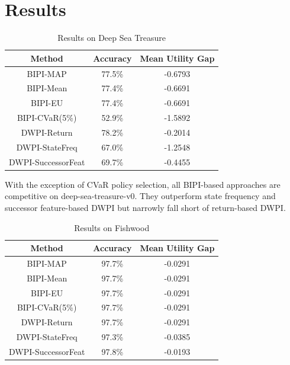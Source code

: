 \documentclass[11pt]{article}
\begin{document}
\section{Results}


\begin{table}[h!]
    \centering
    \caption{Results on Deep Sea Treasure}
    \begin{tabular}{|c|c|c|}
        \hline
        \textbf{Method} & \textbf{Accuracy} & \textbf{Mean Utility Gap} \\
        \hline
        BIPI-MAP & 77.5\% & -0.6793 \\
        \hline
        BIPI-Mean & 77.4\% & -0.6691 \\
        \hline
        BIPI-EU & 77.4\% & -0.6691 \\
        \hline
        BIPI-CVaR(5\%) & 52.9\% & -1.5892 \\
        \hline
        DWPI-Return & 78.2\% & -0.2014 \\
        \hline
        DWPI-StateFreq & 67.0\% & -1.2548 \\
        \hline
        DWPI-SuccessorFeat & 69.7\% & -0.4455 \\
        \hline
    \end{tabular}
\end{table}

With the exception of CVaR policy selection, all BIPI-based approaches are competitive on deep-sea-treasure-v0. They outperform state frequency and successor feature-based DWPI but narrowly fall short of return-based DWPI.
\newpage
\begin{table}[h!]
    \centering
    \caption{Results on Fishwood}
    \begin{tabular}{|c|c|c|}
        \hline
        \textbf{Method} & \textbf{Accuracy} & \textbf{Mean Utility Gap} \\
        \hline
        BIPI-MAP & 97.7\% & -0.0291 \\
        \hline
        BIPI-Mean & 97.7\% & -0.0291 \\
        \hline
        BIPI-EU & 97.7\% & -0.0291 \\
        \hline
        BIPI-CVaR(5\%) & 97.7\% & -0.0291 \\
        \hline
        DWPI-Return & 97.7\% & -0.0291 \\
        \hline
        DWPI-StateFreq & 97.3\% & -0.0385 \\
        \hline
        DWPI-SuccessorFeat & 97.8\% & -0.0193 \\
        \hline
    \end{tabular}
\end{table}
\end{document}
